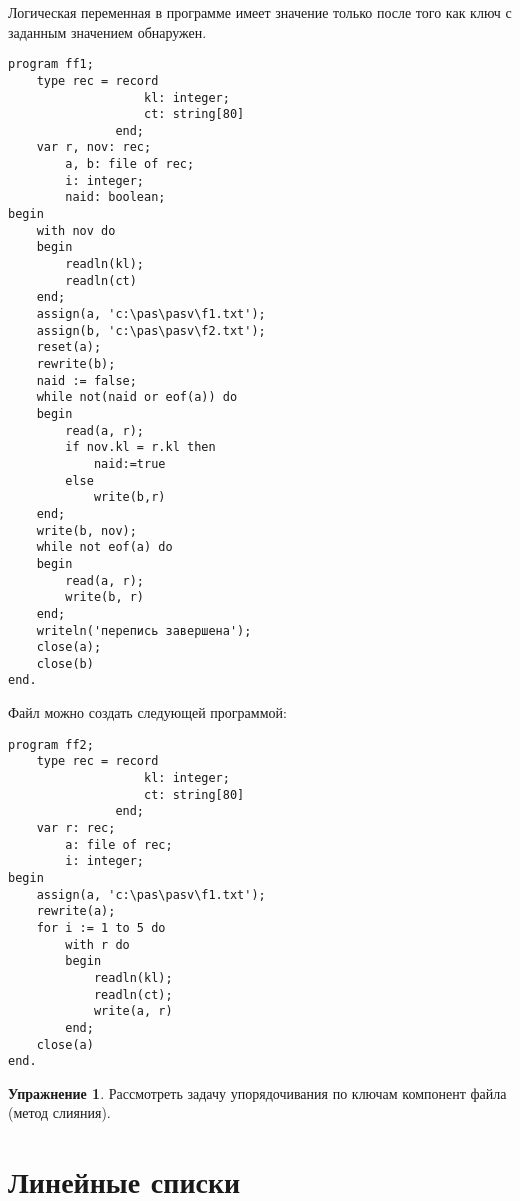 \documentclass[12pt,a4paper]{article}
\theoremstyle{plain}
\theoremstyle{definition}
\newtheorem*{task}{Упражнение}
\theoremstyle{remark}
\begin{document}
Логическая переменная \verb@naid@ в программе имеет значение \verb@true@ только после того как ключ с заданным значением обнаружен.

\begin{verbatim}
program ff1;
    type rec = record
                   kl: integer;
                   ct: string[80]
               end;
    var r, nov: rec;
        a, b: file of rec;
        i: integer;
        naid: boolean;
begin
    with nov do
    begin
        readln(kl);
        readln(ct)
    end;
    assign(a, 'c:\pas\pasv\f1.txt');
    assign(b, 'c:\pas\pasv\f2.txt');
    reset(a);
    rewrite(b);
    naid := false;
    while not(naid or eof(a)) do
    begin
        read(a, r);
        if nov.kl = r.kl then
            naid:=true
        else
            write(b,r)
    end;
    write(b, nov);
    while not eof(a) do
    begin
        read(a, r);
        write(b, r)
    end;
    writeln('перепись завершена');
    close(a);
    close(b)
end.
\end{verbatim}

Файл  можно создать следующей программой:

\begin{verbatim}
program ff2;
    type rec = record
                   kl: integer;
                   ct: string[80]
               end;
    var r: rec;
        a: file of rec;
        i: integer;
begin
    assign(a, 'c:\pas\pasv\f1.txt');
    rewrite(a);
    for i := 1 to 5 do
        with r do
        begin
            readln(kl);
            readln(ct);
            write(a, r)
        end;
    close(a)
end.
\end{verbatim}

\begin{task}
Рассмотреть задачу упорядочивания по ключам компонент файла (метод слияния).
\end{task}

\section{Линейные списки}
\end{document}
